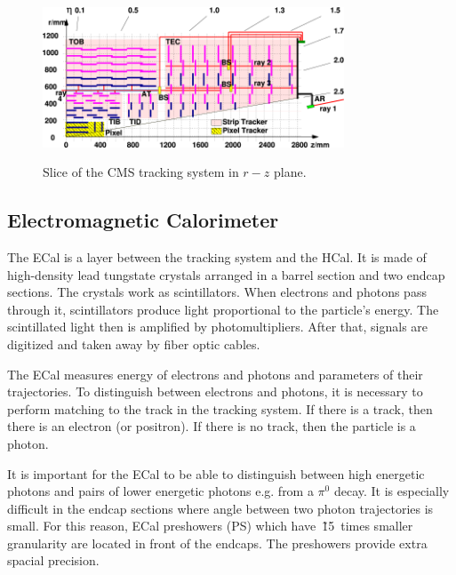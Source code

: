 \begin{figure}[htb]
  \begin{center}
    {\includegraphics[width=0.8\textwidth]{../figs/Exp/tracker_slice.png}}
    \caption{Slice of the CMS tracking system in $r-z$ plane.}
    \label{fig:tracker_slice}
  \end{center}
\end{figure}

\subsection{Electromagnetic Calorimeter}

The ECal is a layer between the tracking system and the HCal. It is made of high-density lead tungstate crystals arranged in a barrel section and two endcap sections. The crystals work as scintillators. When electrons and photons pass through it, scintillators produce light proportional to the particle's energy. The scintillated light then is amplified by photomultipliers. After that, signals are digitized and taken away by fiber optic cables.

The ECal measures energy of electrons and photons and parameters of their trajectories. To distinguish between electrons and photons, it is necessary to perform matching to the track in the tracking system. If there is a track, then there is an electron (or positron). If there is no track, then the particle is a photon.

It is important for the ECal to be able to distinguish between high energetic photons and pairs of lower energetic photons e.g. from a $\pi^0$ decay. It is especially difficult in the endcap sections where angle between two photon trajectories is small. For this reason, ECal preshowers (PS) which have~\~15~times smaller granularity are located in front of the endcaps. The preshowers provide extra spacial precision. 


